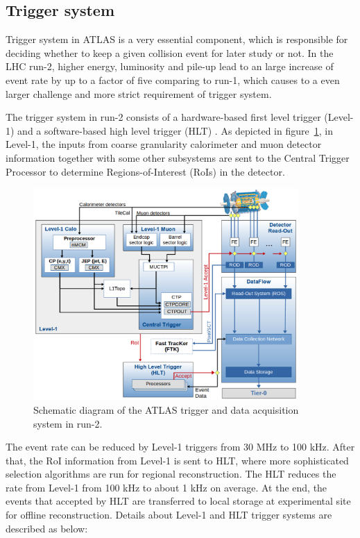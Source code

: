\subsection{Trigger system}

Trigger system in ATLAS is a very essential component, which is responsible for deciding whether to keep a given collision event for later study or not.
In the LHC run-2, higher energy, luminosity and pile-up lead to an large increase of event rate by up to a factor of five comparing to run-1, which causes to a even larger challenge and more strict requirement of trigger system.

The trigger system in run-2 consists of a hardware-based first level trigger (Level-1) and a software-based high level trigger (HLT) \cite{Ruiz-Martinez:2133909}.
As depicted in figure~\ref{fig:trig_syst}, in Level-1, the inputs from coarse granularity calorimeter and muon detector information together with some other subsystems are sent to the Central Trigger Processor to determine Regions-of-Interest (RoIs) in the detector. 
\begin{figure}[!htb]
  \centering
  \includegraphics[width=0.9\textwidth]{figures/Detector/tdaq-run2-schematic2017.png}
  \caption{Schematic diagram of the ATLAS trigger and data acquisition system in run-2.}
  \label{fig:trig_syst}
\end{figure}
The event rate can be reduced by Level-1 triggers from 30 MHz to 100 kHz. 
After that, the RoI information from Level-1 is sent to HLT, where more sophisticated selection algorithms are run for regional reconstruction.
The HLT reduces the rate from Level-1 from 100 kHz to about 1 kHz on average.
At the end, the events that accepted by HLT are transferred to local storage at experimental site for offline reconstruction.
Details about Level-1 and HLT trigger systems are described as below:

